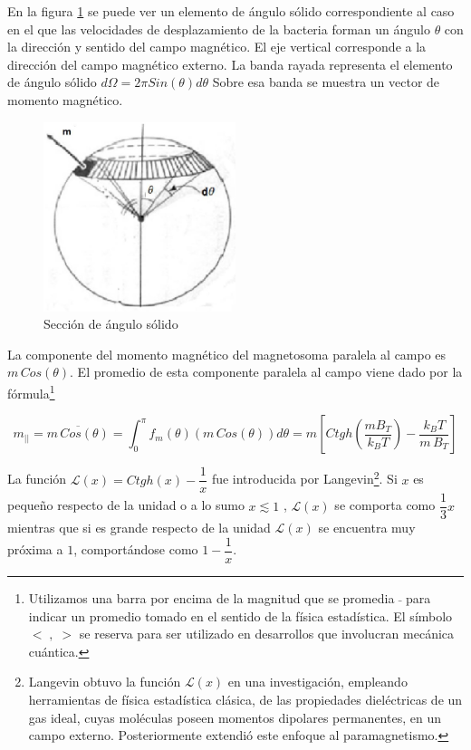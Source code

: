 En la figura \ref{fig:64} se puede ver un elemento de ángulo sólido correspondiente al caso en el que las velocidades de desplazamiento de la bacteria forman un ángulo $\theta$ con la dirección y sentido del campo magnético. El eje vertical corresponde a la dirección del campo magnético externo. La banda rayada representa el elemento de ángulo sólido $d\Omega=2\pi Sin(\theta) d\theta$ Sobre esa banda se muestra un vector de momento magnético.


\begin{figure}[H]
    \centering
    \includegraphics[width=0.5\textwidth]{./Figures/fig64}
	\caption{Sección de ángulo sólido}
	\label{fig:64}
\end{figure}

La componente del momento magnético del magnetosoma paralela al campo es $m\, Cos(\theta)$. El promedio de esta componente paralela al campo viene dado por la fórmula\footnote{Utilizamos una barra por encima de la magnitud que se promedia $\bar{ }$ para indicar un promedio tomado en el sentido de la física estadística. El símbolo $<\;,\;>$ se reserva para ser utilizado en desarrollos que involucran mecánica cuántica.}

\begin{equation}
	\label{eq:61}
	m_{\vert\vert}=\overline{m\, Cos(\theta)}=\int_{0}^{\pi}f_{m}(\theta)(m\,Cos(\theta))d\theta=m\left[ Ctgh\left( \dfrac{m B_{T}}{k_{B}T}\right) -\dfrac{k_{B}T}{m\,B_{T}} \right] 
\end{equation}


La función $\mathcal{L}(x)=Ctgh(x)-\dfrac{1}{x}$ fue introducida por Langevin\footnote{Langevin obtuvo la función $\mathcal{L}(x)$ en una investigación, empleando herramientas de física estadística clásica, de las propiedades dieléctricas de un gas ideal, cuyas moléculas poseen momentos dipolares permanentes, en un campo externo. Posteriormente extendió este enfoque al paramagnetismo.}. Si $x$ es pequeño respecto de la unidad o a lo sumo $x\lesssim 1$ , $\mathcal{L}(x)$ se comporta como $\dfrac{1}{3}x$ mientras que si es grande respecto de la unidad $\mathcal{L}(x)$  se encuentra muy próxima a $1$, comportándose como $1-\dfrac{1}{x}$.

